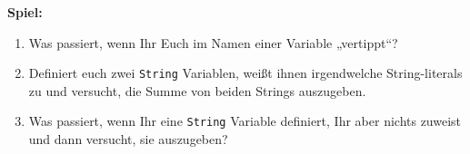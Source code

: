 \textbf{Spiel:}
\begin{enumerate}
\item Was passiert, wenn Ihr Euch im Namen einer Variable „vertippt“?
\item Definiert euch zwei \texttt{String} Variablen, weißt ihnen irgendwelche
  String-literals zu und versucht, die Summe von beiden Strings auszugeben.
\item Was passiert, wenn Ihr eine \texttt{String} Variable definiert, Ihr aber
  nichts zuweist und dann versucht, sie auszugeben?
\end{enumerate}
